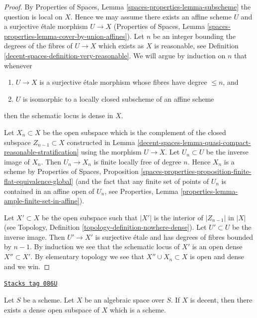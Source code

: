 \begin{proof}
By Properties of Spaces,
Lemma \ref{spaces-properties-lemma-subscheme}
the question is local on $X$. Hence we may assume there exists an affine
scheme $U$ and a surjective \'etale morphism $U \to X$
(Properties of Spaces, Lemma
\ref{spaces-properties-lemma-cover-by-union-affines}).
Let $n$ be an integer bounding the degrees of the fibres of $U \to X$
which exists as $X$ is reasonable, see
Definition \ref{decent-spaces-definition-very-reasonable}.
We will argue by induction on $n$ that whenever
\begin{enumerate}
\item $U \to X$ is a surjective \'etale morphism whose fibres have
degree $\leq n$, and
\item $U$ is isomorphic to a locally closed subscheme of an affine scheme
\end{enumerate}
then the schematic locus is dense in $X$.

\medskip\noindent
Let $X_n \subset X$ be the open subspace which is the complement of the
closed subspace $Z_{n - 1} \subset X$ constructed in
Lemma \ref{decent-spaces-lemma-quasi-compact-reasonable-stratification}
using the morphism $U \to X$.
Let $U_n \subset U$ be the inverse image of $X_n$. Then
$U_n \to X_n$ is finite locally free of degree $n$.
Hence $X_n$ is a scheme by
Properties of Spaces, Proposition
\ref{spaces-properties-proposition-finite-flat-equivalence-global}
(and the fact that any finite set of points of $U_n$ is contained in
an affine open of $U_n$, see
Properties, Lemma \ref{properties-lemma-ample-finite-set-in-affine}).

\medskip\noindent
Let $X' \subset X$ be the open subspace such that $|X'|$ is the
interior of $|Z_{n - 1}|$ in $|X|$ (see
Topology, Definition \ref{topology-definition-nowhere-dense}).
Let $U' \subset U$ be the inverse image. Then $U' \to X'$ is surjective
\'etale and has degrees of fibres bounded by $n - 1$. By induction
we see that the schematic locus of $X'$ is an open dense $X'' \subset X'$.
By elementary topology we see that $X'' \cup X_n \subset X$ is
open and dense and we win.
\end{proof}

\begin{theorem}

\label{decent-spaces-theorem-decent-open-dense-scheme}
\href{https://stacks.math.columbia.edu/tag/086U}{\texttt{Stacks tag 086U}}

Let $S$ be a scheme. Let $X$ be an algebraic space over $S$.
If $X$ is decent, then there exists a dense open subspace
of $X$ which is a scheme.
\end{theorem}

